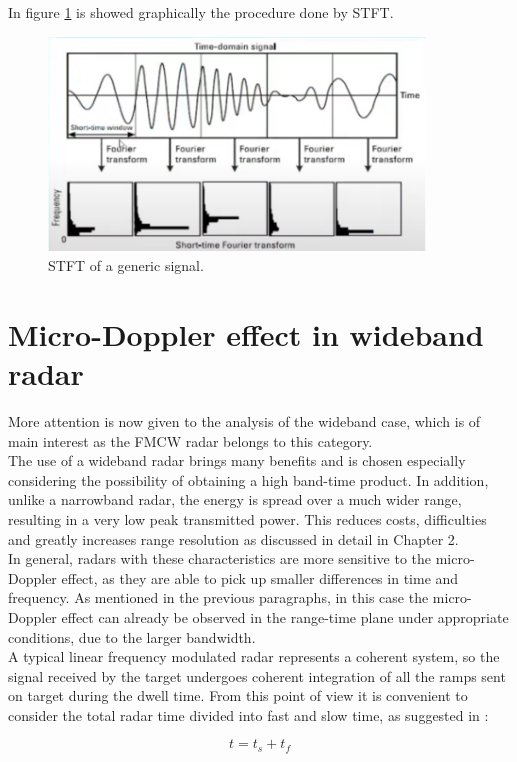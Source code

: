 In figure \ref{STFTgraph} is showed graphically the procedure done by STFT.

\begin{figure}[h!]
    \centering
    \includegraphics[width=10cm]{Time-frequency analysis-chap3/img/STFTexample.png}
    \caption{STFT of a generic signal.}
    \label{STFTgraph}
\end{figure}

\section{Micro-Doppler effect in wideband radar}
More attention is now given to the analysis of the wideband case, which is of main interest as the FMCW radar belongs to this category.\\
The use of a wideband radar brings many benefits and is chosen especially considering the possibility of obtaining a high band-time product. In addition, unlike a narrowband radar, the energy is spread over a much wider range, resulting in a very low peak transmitted power. This reduces costs, difficulties and greatly increases range resolution as discussed in detail in Chapter 2.\\ In general, radars with these characteristics are more sensitive to the micro-Doppler effect, as they are able to pick up smaller differences in time and frequency. As mentioned in the previous paragraphs, in this case the micro-Doppler effect can already be observed in the range-time plane under appropriate conditions, due to the larger bandwidth. \\
A typical linear frequency modulated radar represents a coherent system, so the signal received by the target undergoes coherent integration of all the ramps sent on target during the dwell time. From this point of view it is convenient to consider the total radar time divided into fast and slow time, as suggested in \cite{chen_chinese}:

\begin{equation}
t=t_{s}+t_{f}
\label{fasttimeslowtime}
\end{equation}



